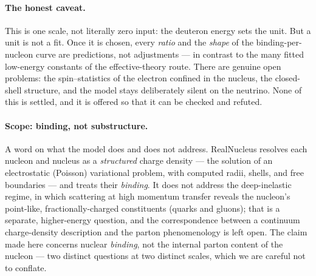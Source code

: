 \documentclass[11pt]{article}
\begin{document}
\paragraph{The honest caveat.} This is one scale, not literally zero input: the deuteron energy sets the
unit. But a unit is not a fit. Once it is chosen, every \emph{ratio} and the \emph{shape} of the
binding-per-nucleon curve are predictions, not adjustments --- in contrast to the many fitted low-energy
constants of the effective-theory route. There are genuine open problems: the spin--statistics of the
electron confined in the nucleus, the closed-shell structure, and the model stays deliberately silent on
the neutrino. None of this is settled, and it is offered so that it can be checked and refuted.

\paragraph{Scope: binding, not substructure.} A word on what the model does and does not address.
RealNucleus resolves each nucleon and nucleus as a \emph{structured} charge density --- the solution of
an electrostatic (Poisson) variational problem, with computed radii, shells, and free boundaries --- and
treats their \emph{binding}. It does not address the deep-inelastic regime, in which scattering at high
momentum transfer reveals the nucleon's point-like, fractionally-charged constituents (quarks and
gluons); that is a separate, higher-energy question, and the correspondence between a continuum
charge-density description and the parton phenomenology is left open. The claim made here concerns
nuclear \emph{binding}, not the internal parton content of the nucleon --- two distinct questions at two
distinct scales, which we are careful not to conflate.
\end{document}

